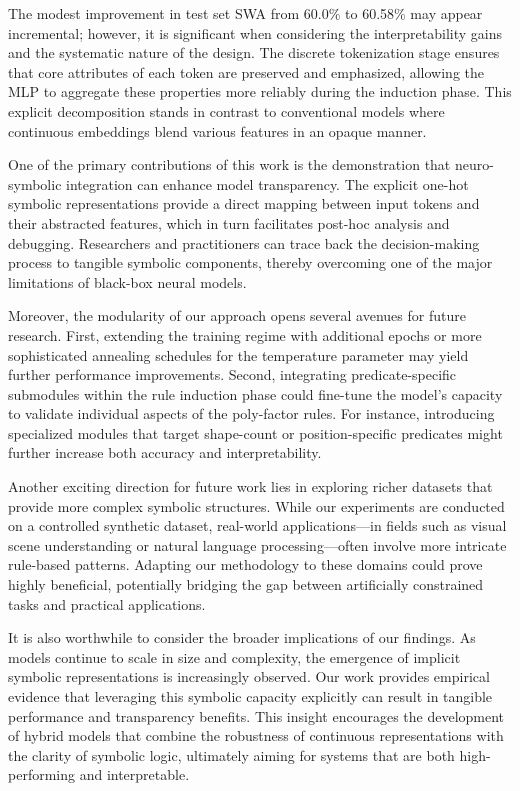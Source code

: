 \documentclass[11pt]{article}
\begin{document}
The modest improvement in test set SWA from 60.0\% to 60.58\% may appear incremental; however, it is significant when considering the interpretability gains and the systematic nature of the design. The discrete tokenization stage ensures that core attributes of each token are preserved and emphasized, allowing the MLP to aggregate these properties more reliably during the induction phase. This explicit decomposition stands in contrast to conventional models where continuous embeddings blend various features in an opaque manner.

One of the primary contributions of this work is the demonstration that neuro-symbolic integration can enhance model transparency. The explicit one-hot symbolic representations provide a direct mapping between input tokens and their abstracted features, which in turn facilitates post-hoc analysis and debugging. Researchers and practitioners can trace back the decision-making process to tangible symbolic components, thereby overcoming one of the major limitations of black-box neural models.

Moreover, the modularity of our approach opens several avenues for future research. First, extending the training regime with additional epochs or more sophisticated annealing schedules for the temperature parameter may yield further performance improvements. Second, integrating predicate-specific submodules within the rule induction phase could fine-tune the model's capacity to validate individual aspects of the poly-factor rules. For instance, introducing specialized modules that target shape-count or position-specific predicates might further increase both accuracy and interpretability.

Another exciting direction for future work lies in exploring richer datasets that provide more complex symbolic structures. While our experiments are conducted on a controlled synthetic dataset, real-world applications—in fields such as visual scene understanding or natural language processing—often involve more intricate rule-based patterns. Adapting our methodology to these domains could prove highly beneficial, potentially bridging the gap between artificially constrained tasks and practical applications.

It is also worthwhile to consider the broader implications of our findings. As models continue to scale in size and complexity, the emergence of implicit symbolic representations is increasingly observed. Our work provides empirical evidence that leveraging this symbolic capacity explicitly can result in tangible performance and transparency benefits. This insight encourages the development of hybrid models that combine the robustness of continuous representations with the clarity of symbolic logic, ultimately aiming for systems that are both high-performing and interpretable.
\end{document}
